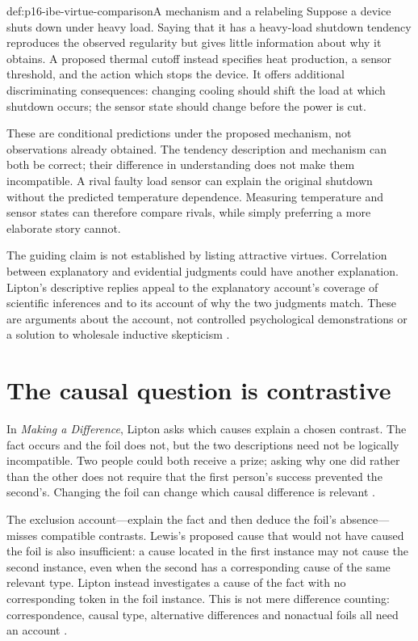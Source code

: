 \begin{hbexample}{def:p16-ibe-virtue-comparison}{A mechanism and a relabeling}
Suppose a device shuts down under heavy load. Saying that it has a
heavy-load shutdown tendency reproduces the observed regularity but gives
little information about why it obtains. A proposed thermal cutoff instead
specifies heat production, a sensor threshold, and the action which stops
the device. It offers additional discriminating consequences: changing
cooling should shift the load at which shutdown occurs; the sensor state
should change before the power is cut.

These are conditional predictions under the proposed mechanism, not
observations already obtained. The tendency description and mechanism can
both be correct; their difference in understanding does not make them
incompatible. A rival faulty load sensor can explain the original shutdown
without the predicted temperature dependence. Measuring temperature and
sensor states can therefore compare rivals, while simply preferring a
more elaborate story cannot.
\end{hbexample}

The guiding claim is not established by listing attractive virtues.
Correlation between explanatory and evidential judgments could have another
explanation. Lipton's descriptive replies appeal to the explanatory
account's coverage of scientific inferences and to its account of why
the two judgments match. These are arguments about the account, not
controlled psychological demonstrations or a solution to wholesale
inductive skepticism \cite[author copy pp.~8--11]{Lipton2000IBECompanion}.

\section{The causal question is contrastive}
\label{sec:p16-ibe-contrast}

In \emph{Making a Difference}, Lipton asks which causes explain a chosen
contrast. The fact occurs and the foil does not, but the two descriptions
need not be logically incompatible. Two people could both receive a prize;
asking why one did rather than the other does not require that the first
person's success prevented the second's. Changing the foil can change
which causal difference is relevant \cite[secs.~1--2, author copy
pp.~1--8]{Lipton1993MakingDifference}.

The exclusion account---explain the fact and then deduce the foil's
absence---misses compatible contrasts. Lewis's proposed cause that would
not have caused the foil is also insufficient: a cause located in the
first instance may not cause the second instance, even when the second
has a corresponding cause of the same relevant type. Lipton instead
investigates a cause of the fact with no corresponding token in the foil
instance. This is not mere difference counting: correspondence, causal
type, alternative differences and nonactual foils all need an account
\cite[sec.~2]{Lipton1993MakingDifference}.

